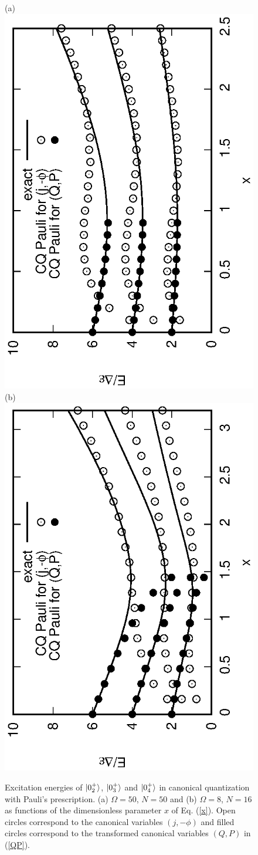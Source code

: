 \documentclass[11pt]{book} %
\begin{document}
\begin{figure}[t]
 \begin{center}
(a)	 \includegraphics[height=0.6\textwidth,angle=-90]{images/N50can_trans.eps}
\\
(b)	 \includegraphics[height=0.6\textwidth,angle=-90]{images/N16can_trans.eps}
 \end{center}
 \caption{Excitation energies of $\ket{0_2^+}$, $\ket{0_3^+}$ and
$\ket{0_4^+}$ in canonical quantization with Pauli's prescription. (a) $\Omega=50$, $N=50$ and (b) $\Omega=8$, $N=16$ 
	as functions of the dimensionless parameter $x$ of Eq. (\ref{x}). Open circles correspond to the canonical variables $(j, -\phi)$ and filled circles correspond to the transformed canonical variables $(Q, P)$ in (\ref{QP}).
}
 \label{CQ-energy}
\end{figure}

\end{document}
